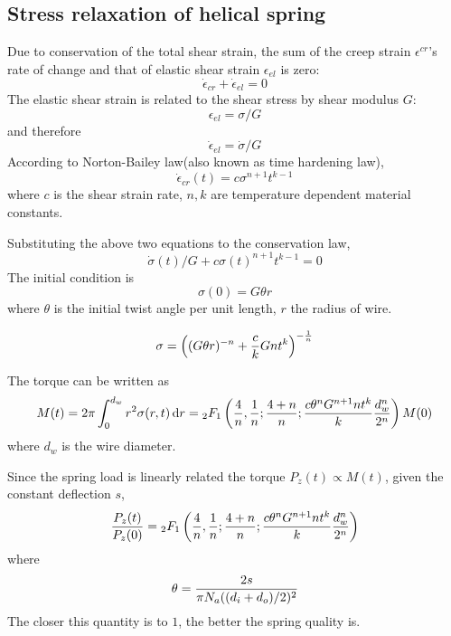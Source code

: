 \documentclass[10pt]{article}
\begin{document}
\subsection{Stress relaxation of helical spring}
\label{sec:Relaxation}

Due to conservation of the total shear strain, the sum of the creep strain $\epsilon^{cr}$'s rate of change and that of elastic shear strain $\epsilon_{el}$ is zero:
\[
\dot{\epsilon}_{cr} + \dot{\epsilon}_{el} = 0
\]
The elastic shear strain is related to the shear stress by shear modulus $G$:
\[
\epsilon_{el} = \sigma/G
\]
and therefore
\[
\dot{\epsilon}_{el} = \dot{\sigma}/G
\]
According to Norton-Bailey law(also known as time hardening law),
\begin{equation} \label{eq:N-B}
\dot{\epsilon}_{cr}(t)=c\sigma^{n+1} t^{k-1}
\end{equation}
where $c$ is the shear strain rate, $n,k$ are temperature dependent material constants.

Substituting the above two equations to the conservation law,
\begin{equation} \label{eq:diff}
\dot{\sigma}(t)/G+c\sigma(t)^{n+1} t^{k-1}=0
\end{equation}
The initial condition is
\[
\sigma (0) = G\theta r
\]
where $\theta$ is the initial twist angle per unit length, $r$ the radius of wire.

\[
\sigma = \left( (G\theta r)^{-n} + {c\over k} Gnt^k \right)^{-{1\over n}}
\]

The torque can be written as
\[
M(t) = 2\pi \int_0^{d_w} r^2 \sigma(r,t)\,\mathrm{d} r ={}_{2}F_1 \left( {4\over n},{1\over n};{4+n\over n};{c\theta^n G^{n+1} n t^k\over k} {d_w^n\over 2^n}\right) M(0)
\]
where $d_w$ is the wire diameter.

Since the spring load is linearly related the torque $P_z(t)\propto M(t)$, given the constant deflection $s$,
\[
{P_z(t)\over P_z(0)} = {}_{2}F_1 \left( {4\over n},{1\over n};{4+n\over n};{c\theta^n G^{n+1} n t^k\over k} {d_w^n\over 2^n}\right)
\]
where
\[
\theta = {2s\over \pi N_a ((d_i+d_o)/2)^2}
\]
The closer this quantity is to $1$, the better the spring quality is.
\end{document}
